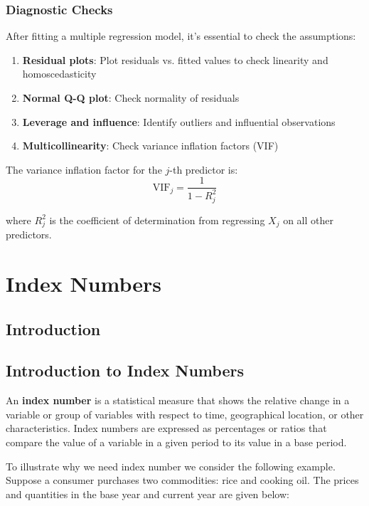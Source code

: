 \documentclass[twoside]{book}
\begin{document}
\subsection{Diagnostic Checks}

After fitting a multiple regression model, it's essential to check the assumptions:

\begin{enumerate}
    \item \textbf{Residual plots}: Plot residuals vs. fitted values to check linearity and homoscedasticity
    \item \textbf{Normal Q-Q plot}: Check normality of residuals
    \item \textbf{Leverage and influence}: Identify outliers and influential observations
    \item \textbf{Multicollinearity}: Check variance inflation factors (VIF)
\end{enumerate}

The variance inflation factor for the $j$-th predictor is:
\begin{equation}
\text{VIF}_j = \frac{1}{1-R_j^2}
\end{equation}

where $R_j^2$ is the coefficient of determination from regressing $X_j$ on all other predictors.


\chapter{Index Numbers}

\section{Introduction}

\section{Introduction to Index Numbers}

An \textbf{index number} is a statistical measure that shows the relative change in a variable or group of variables with respect to time, geographical location, or other characteristics. Index numbers are expressed as percentages or ratios that compare the value of a variable in a given period to its value in a base period.

To illustrate why we need index number we consider the following example. Suppose a consumer purchases two commodities: rice and cooking oil. The prices and quantities in the base year and current year are given below:
\end{document}
